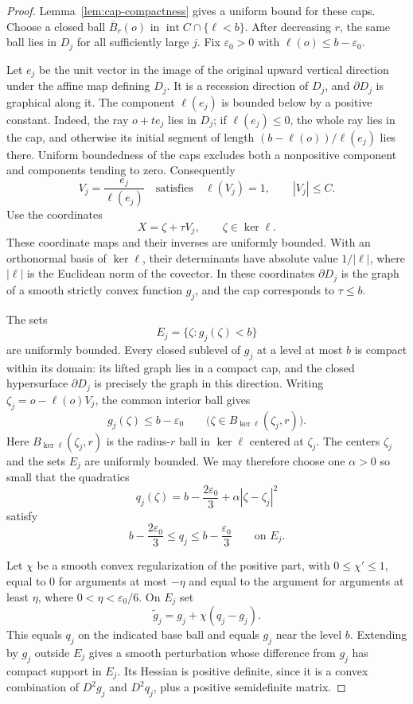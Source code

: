 \begin{proof}
Lemma~\ref{lem:cap-compactness} gives a uniform bound for these caps.
Choose a closed ball \(\overline B_r(o)\) in
\(\operatorname{int}C\cap\{\ell<b\}\).
After decreasing \(r\), the same ball lies in \(D_j\) for all sufficiently
large \(j\).  Fix \(\varepsilon_0>0\) with
\(\ell(o)\le b-\varepsilon_0\).

Let \(e_j\) be the unit vector in the image of the original upward vertical
direction under the affine map defining \(D_j\).  It is a recession
direction of \(D_j\), and \(\partial D_j\) is graphical along it.  The
component \(\ell(e_j)\) is bounded below by a positive constant.  Indeed,
the ray \(o+t e_j\) lies in \(D_j\); if \(\ell(e_j)\le0\), the whole ray
lies in the cap, and otherwise its initial segment of length
\((b-\ell(o))/\ell(e_j)\) lies there.  Uniform boundedness of the caps
excludes both a nonpositive component and components tending to zero.
Consequently
\[
 V_j=\frac{e_j}{\ell(e_j)}
 \quad\text{satisfies}\quad
 \ell(V_j)=1,\qquad |V_j|\le C.
\]
Use the coordinates
\[
 X=\zeta+\tau V_j,\qquad \zeta\in\ker\ell.
\]
These coordinate maps and their inverses are uniformly bounded.
With an orthonormal basis of \(\ker\ell\), their determinants have absolute
value \(1/|\ell|\), where \(|\ell|\) is the Euclidean norm of the covector.
In these coordinates \(\partial D_j\) is the graph of a smooth strictly
convex function \(g_j\), and the cap corresponds to \(\tau\le b\).

The sets
\[
 E_j=\{\zeta:g_j(\zeta)<b\}
\]
are uniformly bounded.  Every closed sublevel of \(g_j\) at a level at
most \(b\) is compact within its domain: its lifted graph lies in a
compact cap, and the closed hypersurface \(\partial D_j\) is precisely
the graph in this direction.
Writing \(\zeta_j=o-\ell(o)V_j\), the common interior ball gives
\[
 g_j(\zeta)\le b-\varepsilon_0
 \qquad\bigl(\zeta\in B_{\ker\ell}(\zeta_j,r)\bigr).
\]
Here \(B_{\ker\ell}(\zeta_j,r)\) is the radius-\(r\) ball in
\(\ker\ell\) centered at \(\zeta_j\).
The centers \(\zeta_j\) and the sets \(E_j\) are uniformly bounded.
We may therefore choose one \(\alpha>0\) so small that the quadratics
\[
 q_j(\zeta)=b-\frac{2\varepsilon_0}{3}
                +\alpha|\zeta-\zeta_j|^2
\]
satisfy
\[
 b-\frac{2\varepsilon_0}{3}\le q_j
       \le b-\frac{\varepsilon_0}{3}
 \qquad\text{on }E_j.
\]

Let \(\chi\) be a smooth convex regularization of the positive part, with
\(0\le\chi'\le1\), equal to \(0\) for arguments at most \(-\eta\) and
equal to the argument for arguments at least \(\eta\), where
\(0<\eta<\varepsilon_0/6\).  On \(E_j\) set
\[
 \widetilde g_j=g_j+\chi(q_j-g_j).
\]
This equals \(q_j\) on the indicated base ball and equals \(g_j\) near
the level \(b\).  Extending by \(g_j\) outside \(E_j\) gives a smooth
perturbation whose difference from \(g_j\) has compact support in \(E_j\).
Its Hessian is positive definite, since it is a convex combination of
\(D^2g_j\) and \(D^2q_j\), plus a positive semidefinite matrix.


\end{proof}
